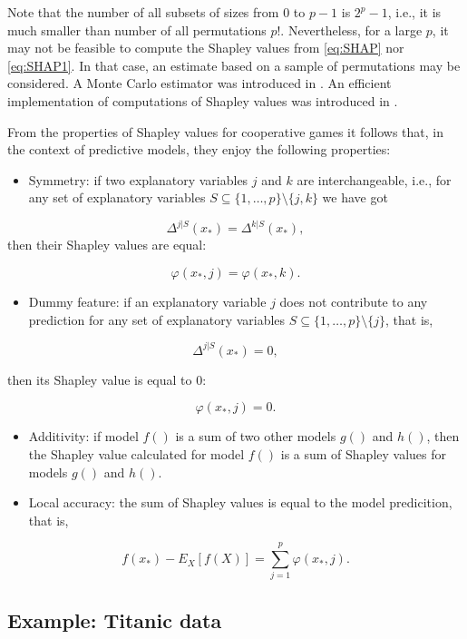 \documentclass[12pt,]{krantz}
\providecommand{\tightlist}{%
  \setlength{\itemsep}{0pt}\setlength{\parskip}{0pt}}
\begin{document}
Note that the number of all subsets of sizes from 0 to \(p-1\) is \(2^{p}-1\), i.e., it is much smaller than number of all permutations \(p!\). Nevertheless, for a large \(p\), it may not be feasible to compute the Shapley values from \eqref{eq:SHAP} nor \eqref{eq:SHAP1}. In that case, an estimate based on a sample of permutations may be considered. A Monte Carlo estimator was introduced in \citep{Strumbelj2014}. An efficient implementation of computations of Shapley values was introduced in \citep{SHAP}.

From the properties of Shapley values for cooperative games it follows that, in the context of predictive models, they enjoy the following properties:

\begin{itemize}
\tightlist
\item
  Symmetry: if two explanatory variables \(j\) and \(k\) are interchangeable, i.e., for any set of explanatory variables \(S \subseteq \{1,\dots,p\}\setminus \{j,k\}\) we have got
\end{itemize}

\[
\Delta^{j|S}(x_*) = \Delta^{k|S}(x_*),
\]
then their Shapley values are equal:

\[
\varphi(x_*,j) = \varphi(x_*,k).
\]

\begin{itemize}
\tightlist
\item
  Dummy feature: if an explanatory variable \(j\) does not contribute to any prediction for any set of explanatory variables \(S \subseteq \{1,\dots,p\}\setminus \{j\}\), that is,
\end{itemize}

\[
\Delta^{j|S}(x_*) = 0,
\]

then its Shapley value is equal to 0:

\[
\varphi(x_*,j) = 0.
\]

\begin{itemize}
\item
  Additivity: if model \(f()\) is a sum of two other models \(g()\) and \(h()\), then the Shapley value calculated for model \(f()\) is a sum of Shapley values for models \(g()\) and \(h()\).
\item
  Local accuracy: the sum of Shapley values is equal to the model predicition, that is,
\end{itemize}

\[
f(x_*) - E_X[f(X)] = \sum_{j=1}^p   \varphi(x_*,j). 
\]

\hypertarget{SHAPExample}{%
\subsection{Example: Titanic data}\label{SHAPExample}}
\end{document}
